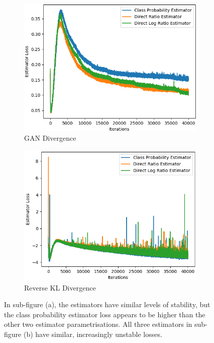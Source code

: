 \documentclass[honours,12pt]{unswthesis}
\numberwithin{equation}{section}
\theoremstyle{definition}
\begin{document}
\newpage
\begin{figure}
\begin{subfigure}{0.49\textwidth}
\includegraphics[width=\linewidth]{estimator_losses/JCADVvsJCADVexpvsJCADVgudlog.png}
\caption{GAN Divergence}
\end{subfigure}
\begin{subfigure}{0.49\textwidth}
\includegraphics[width=\linewidth]{estimator_losses/JCKLDvsJCKLexpvsJCKLgudlog.png}
\caption{Reverse KL Divergence}
\end{subfigure}
\caption{\small In sub-figure (a), the estimators have similar levels of stability, but the class probability estimator loss appears to be higher than the other two estimator parametrisations. All three estimators in sub-figure (b) have similar, increasingly unstable losses.}
\label{fig:6.6}
\end{figure}
\end{document}

